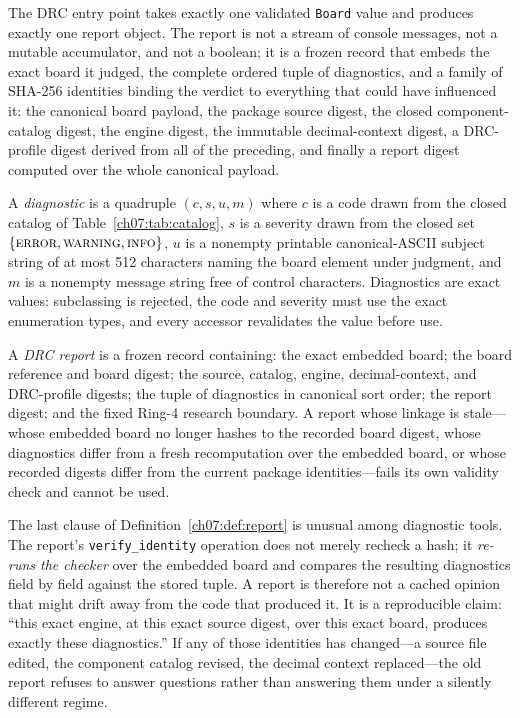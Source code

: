 The DRC entry point takes exactly one validated \texttt{Board} value and produces exactly one report object. The report is not a stream of console messages, not a mutable accumulator, and not a boolean; it is a frozen record that embeds the exact board it judged, the complete ordered tuple of diagnostics, and a family of SHA-256 identities binding the verdict to everything that could have influenced it: the canonical board payload, the package source digest, the closed component-catalog digest, the engine digest, the immutable decimal-context digest, a DRC-profile digest derived from all of the preceding, and finally a report digest computed over the whole canonical payload.

\begin{definition}[Diagnostic]\label{ch07:def:diagnostic}
A \emph{diagnostic} is a quadruple $(c, s, u, m)$ where $c$ is a code drawn from the closed catalog of Table~\ref{ch07:tab:catalog}, $s$ is a severity drawn from the closed set $\{\textsc{error}, \textsc{warning}, \textsc{info}\}$, $u$ is a nonempty printable canonical-ASCII subject string of at most 512 characters naming the board element under judgment, and $m$ is a nonempty message string free of control characters. Diagnostics are exact values: subclassing is rejected, the code and severity must use the exact enumeration types, and every accessor revalidates the value before use.
\end{definition}

\begin{definition}\label{ch07:def:report}
A \emph{DRC report} is a frozen record containing: the exact embedded board; the board reference and board digest; the source, catalog, engine, decimal-context, and DRC-profile digests; the tuple of diagnostics in canonical sort order; the report digest; and the fixed Ring-4 research boundary. A report whose linkage is stale---whose embedded board no longer hashes to the recorded board digest, whose diagnostics differ from a fresh recomputation over the embedded board, or whose recorded digests differ from the current package identities---fails its own validity check and cannot be used.
\end{definition}

The last clause of Definition~\ref{ch07:def:report} is unusual among diagnostic tools. The report's \texttt{verify\_identity} operation does not merely recheck a hash; it \emph{re-runs the checker} over the embedded board and compares the resulting diagnostics field by field against the stored tuple. A report is therefore not a cached opinion that might drift away from the code that produced it. It is a reproducible claim: ``this exact engine, at this exact source digest, over this exact board, produces exactly these diagnostics.'' If any of those identities has changed---a source file edited, the component catalog revised, the decimal context replaced---the old report refuses to answer questions rather than answering them under a silently different regime.

